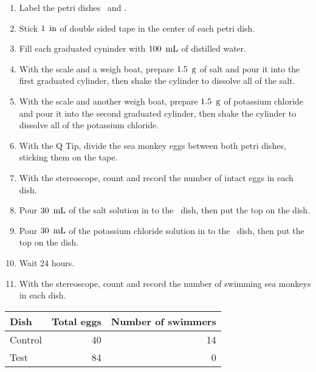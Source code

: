 \documentclass[12pt]{article}
\begin{document}
\begin{enumerate}
    \item Label the petri dishes \control\ and \test.
    \item Stick $1\operatorname{\ in}$ of double sided tape in the center of each petri dish.
    \item Fill each graduated cyninder with $100\operatorname{\ mL}$ of distilled water.
    \item With the scale and a weigh boat, prepare $1.5\operatorname{\ g}$ of salt and pour it into the first graduated cylinder, then shake the cylinder to dissolve all of the salt.
    \item With the scale and another weigh boat, prepare $1.5\operatorname{\ g}$ of potassium chloride and pour it into the second graduated cylinder, then shake the cylinder to dissolve all of the potassium chloride.
    \item With the Q Tip, divide the sea monkey eggs between both petri dishes, sticking them on the tape.
    \item With the stereoscope, count and record the number of intact eggs in each dish.
    \item Pour $30\operatorname{\ mL}$ of the salt solution in to the \control\ dish, then put the top on the dish.
    \item Pour $30\operatorname{\ mL}$ of the potassium chloride solution in to the \test\ dish, then put the top on the dish.
    \item Wait 24 hours.
    \item With the stereoscope, count and record the number of swimming sea monkeys in each dish.
\end{enumerate}\double

\begin{center}
\begin{tabular}{l|rr}
Dish & Total eggs & Number of swimmers \\
\hline
Control & 40 & 14 \\
Test & 84 & 0 \\
\end{tabular}
\end{center}\double
\end{document}
